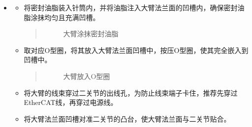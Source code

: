 \documentclass[a4paper,11pt,english,openany,oneside]{sphinxmanual}
\begin{document}
\begin{itemize}
\begin{itemize}
\item {} 
\sphinxAtStartPar
将固定关节的外六角螺栓和垫片放入一关节的螺纹孔中，并使用开口扳手按对角顺序拧紧螺栓。扳手和螺栓的规格参考 {\hyperref[\detokenize{_u66f4_u6362_u5173_u8282:id9}]{}} 。
\begin{quote}

\begin{figure}[H]
\centering
\capstart

\noindent{}
\caption{拧紧一关节螺钉}\label{\detokenize{_u66f4_u6362_u5173_u8282:id50}}\end{figure}
\end{quote}

\end{itemize}

\item {} 
\sphinxAtStartPar
{}
\begin{itemize}
\item {} 
\sphinxAtStartPar
将密封油脂装入针筒内，并将油脂注入大臂法兰面的凹槽内，确保密封油脂涂抹均匀且充满凹槽。
\begin{quote}

\begin{figure}[H]
\centering
\capstart

\noindent{}
\caption{大臂涂抹密封油脂}\label{\detokenize{_u66f4_u6362_u5173_u8282:id51}}\end{figure}
\end{quote}

\item {} 
\sphinxAtStartPar
取对应O型圈，将其放入大臂法兰面凹槽中，按压O型圈，使其完全嵌入到凹槽中。
\begin{quote}

\begin{figure}[H]
\centering
\capstart

\noindent{}
\caption{大臂放入O型圈}\label{\detokenize{_u66f4_u6362_u5173_u8282:id52}}\end{figure}
\end{quote}

\item {} 
\sphinxAtStartPar
将大臂的线束穿过二关节的出线孔，为防止线束端子卡住，推荐先穿过EtherCAT线，再穿过电源线。

\item {} 
\sphinxAtStartPar
将大臂法兰面凹槽对准二关节的凸台，使大臂法兰面与二关节贴合。
\begin{quote}


\end{quote}
\end{itemize}
\end{itemize}
\end{document}
